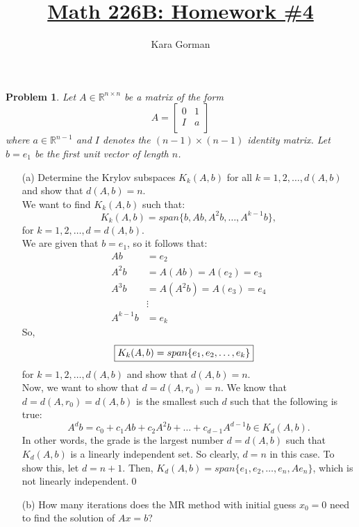 \documentclass[12pt]{article}
\title{\underline{Math 226B: Homework \#4}}
\author{\huge Kara Gorman}
\newtheorem{problem}{Problem}
\def\R{\mathbb{R}}
\begin{document}
\maketitle


\bigskip\bigskip
\noindent
\begin{problem}
Let $A\in\R^{n\times n}$ be a matrix of the form
$$A = \begin{bmatrix}
0 & 1 \\
I & a \\
\end{bmatrix}$$
where $a\in\R^{n-1}$ and $I$ denotes the $(n-1)\times (n-1)$ identity matrix.  Let $b=e_1$ be the first unit vector of length $n$.
\end{problem}
\begin{itemize}
\item[(a)] Determine the Krylov subspaces $K_k(A,b)$ for all $k=1,2,\dots,d(A,b)$ and show that $d(A,b) = n$.\\

We want to find $K_k(A,b)$ such that:
$$K_k(A,b) = span\{b,Ab,A^2b, \dots, A^{k-1}b\},$$
for $k = 1,2,\dots,d=d(A,b)$.\\
We are given that $b = e_1$, so it follows that:
\begin{align}
Ab &= e_2 \nonumber \\
A^2b &= A(Ab) = A(e_2) = e_3 \nonumber \\
A^3b&= A(A^2b) = A(e_3) = e_4 \nonumber \\
&\vdots \nonumber \\
A^{k-1}b &= e_k \nonumber 
\end{align}
So,
\begin{align}
\Aboxed{K_k(A,b) = span\{e_1, e_2, \dots, e_k\}} \nonumber
\end{align}
for $k=1,2,\dots,d(A,b)$ and show that $d(A,b) = n$.\\

Now, we want to show that $d=d(A,r_0) = n$.  We know that $d = d(A,r_0)=d(A,b)$ is the smallest such $d$ such that the following is true:
$$A^db = c_0 + c_1Ab + c_2A^2b + \dots + c_{d-1}A^{d-1}b \in K_d(A,b).$$
In other words, the grade is the largest number $d = d(A,b)$ such that $K_d(A,b)$ is a linearly independent set.  So clearly, $d = n$ in this case. To show this, let $d = n + 1$.  Then, $K_d(A,b) = span\{e_1, e_2, \dots, e_n, Ae_n\}$, which is not linearly independent.\qed\\


\item[(b)] How many iterations does the MR method with initial guess $x_0 = 0$ need to find the solution of $Ax=b$?\\


\end{itemize}
\end{document}
